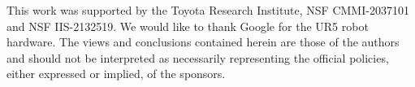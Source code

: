 \documentclass[Afour,sageh,times]{sagej}
\begin{document}

\begin{funding}
This work was supported by the Toyota Research Institute, NSF CMMI-2037101 and NSF IIS-2132519. We would like to thank Google for the UR5 robot hardware. The views and conclusions contained herein are those of the authors and should not be interpreted as necessarily representing the official policies, either expressed or implied, of the sponsors.
\end{funding}


%
% 


\appendix

\end{document}

